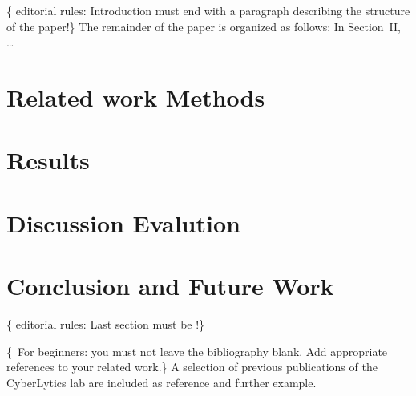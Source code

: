 \documentclass[conference,flushend]{iaria-lite}
\begin{document}
\{\faWarning{}  editorial rules: Introduction must end with a paragraph describing the structure of the paper!\}
The remainder of the paper is organized as follows: In Section~II, …

\section{Related work \textbar{} Methods}
\lipsum[13]

\section{Results}
\lipsum[14]

\section{Discussion \textbar{} Evalution}
\lipsum[15]

\section{Conclusion and Future Work}
\{\faWarning{}  editorial rules: Last section must be !\}
\lipsum[16]

\{\,\faWarning{} For beginners: you must not leave the bibliography blank. Add appropriate references to your related work.\}
%
A selection of previous   publications of the CyberLytics lab
%
%
\cite{%
LeNe24goalHijackingLLMs,%
LeNe24vocattllm,%
PANP23seccloudfogai,%
StNe23foodfresh}
%
%
are included as reference and further example.

\begingroup
\sloppy
\printbibliography
\endgroup 
\end{document}
